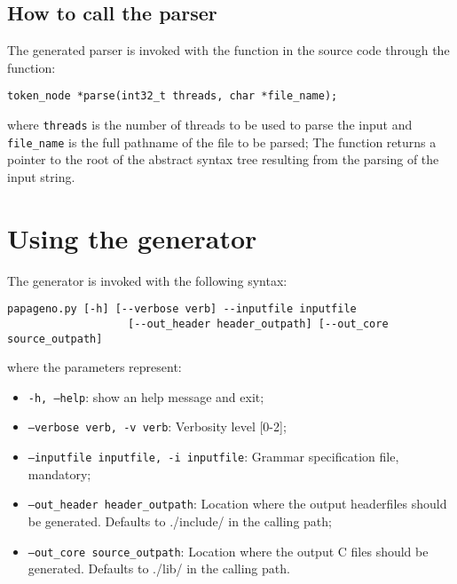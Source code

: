 \documentclass[a4paper,10pt]{article}
\begin{document}
\subsection{How to call the parser}

The generated parser is invoked with the function in the source code through the function:

\begin{verbatim}
token_node *parse(int32_t threads, char *file_name);
\end{verbatim}

where \texttt{threads} is the number of threads to be used to parse the input and \texttt{file\_name} is the full pathname of the file to be parsed;
The function returns a pointer to the root of the abstract syntax tree resulting from the parsing of the input string. \textbf{}

\section{Using the generator}

The generator is invoked with the following syntax:\\
\begin{verbatim}
papageno.py [-h] [--verbose verb] --inputfile inputfile
                   [--out_header header_outpath] [--out_core source_outpath]
 \end{verbatim}

where the parameters represent:
\begin{itemize}
 \item  \texttt{-h, --help}: show an help message and exit;
 \item  \texttt{--verbose verb, -v verb}:  Verbosity level [0-2];
 \item  \texttt{--inputfile inputfile, -i inputfile}: Grammar specification file, mandatory;
 \item  \texttt{--out\_header header\_outpath}: Location where the output headerfiles should be generated. Defaults to ./include/ in the calling path;
 \item  \texttt{--out\_core source\_outpath}: Location where the output C files should be generated. Defaults to ./lib/ in the calling path.
\end{itemize}
\end{document}
